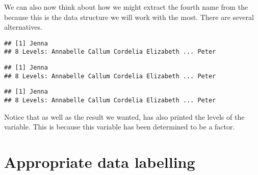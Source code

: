We can also now think about how we might extract the fourth name from the  because this is the data structure we will work with the most. There are several alternatives. 
\begin{knitrout}
\color{fgcolor}\begin{kframe}
\begin{alltt}
\hlstd{MyFirstDF[}\hlstd{,}\hlstd{]}
\end{alltt}
\begin{verbatim}
## [1] Jenna
## 8 Levels: Annabelle Callum Cordelia Elizabeth ... Peter
\end{verbatim}
\begin{alltt}
\hlstd{MyFirstDF[}\hlstd{,}\hlstd{]}
\end{alltt}
\begin{verbatim}
## [1] Jenna
## 8 Levels: Annabelle Callum Cordelia Elizabeth ... Peter
\end{verbatim}
\begin{alltt}
\hlopt{$}\hlstd{Names[}\hlstd{]}
\end{alltt}
\begin{verbatim}
## [1] Jenna
## 8 Levels: Annabelle Callum Cordelia Elizabeth ... Peter
\end{verbatim}
\end{kframe}
\end{knitrout}
 
Notice that as well as the result we wanted, \R{} has also printed the levels of the  variable. This is because this variable has been determined to be a factor. 
 
 
 
\section{Appropriate data labelling} 
 
